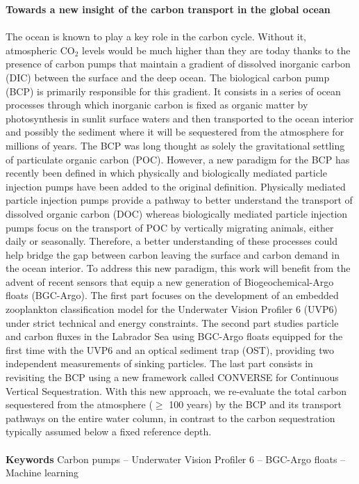 \documentclass[a4paper]{report}
\begin{document}
\textbf{Towards a new insight of the carbon transport in the global ocean}\\
\\
The ocean is known to play a key role in the carbon cycle. Without it, atmospheric CO$_{2}$ levels would be much higher than they are today thanks to the presence of carbon pumps that maintain a gradient of dissolved inorganic carbon (DIC) between the surface and the deep ocean. The biological carbon pump (BCP) is primarily responsible for this gradient. It consists in a series of ocean processes through which inorganic carbon is fixed as organic matter by photosynthesis in sunlit surface waters and then transported to the ocean interior and possibly the sediment where it will be sequestered from the atmosphere for millions of years. The BCP was long thought as solely the gravitational settling of particulate organic carbon (POC). However, a new paradigm for the BCP has recently been defined in which physically and biologically mediated particle injection pumps have been added to the original definition. Physically mediated particle injection pumps provide a pathway to better understand the transport of dissolved organic carbon (DOC) whereas biologically mediated particle injection pumps focus on the transport of POC by vertically migrating animals, either daily or seasonally. Therefore, a better understanding of these processes could help bridge the gap between carbon leaving the surface and carbon demand in the ocean interior. To address this new paradigm, this work will benefit from the advent of recent sensors that equip a new generation of Biogeochemical-Argo floats (BGC-Argo). The first part focuses on the development of an embedded zooplankton classification model for the Underwater Vision Profiler 6 (UVP6) under strict technical and energy constraints. The second part studies particle and carbon fluxes in the Labrador Sea using BGC-Argo floats equipped for the first time with the UVP6 and an optical sediment trap (OST), providing two independent measurements of sinking particles. The last part consists in revisiting the BCP using a new framework called CONVERSE for Continuous Vertical Sequestration. With this new approach, we re-evaluate the total carbon sequestered from the atmosphere ($\geq$ 100 years) by the BCP and its transport pathways on the entire water column, in contrast to the carbon sequestration typically assumed below a fixed reference depth.\\
\\
\textbf{Keywords} Carbon pumps -- Underwater Vision Profiler 6 -- BGC-Argo floats -- Machine learning
\end{document}
